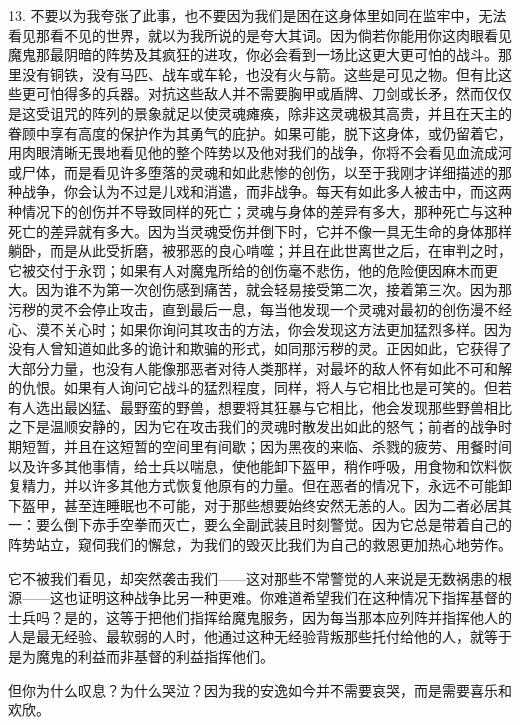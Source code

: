 13. 不要以为我夸张了此事，也不要因为我们是困在这身体里如同在监牢中，无法看见那看不见的世界，就以为我所说的是夸大其词。因为倘若你能用你这肉眼看见魔鬼那最阴暗的阵势及其疯狂的进攻，你必会看到一场比这更大更可怕的战斗。那里没有铜铁，没有马匹、战车或车轮，也没有火与箭。这些是可见之物。但有比这些更可怕得多的兵器。对抗这些敌人并不需要胸甲或盾牌、刀剑或长矛，然而仅仅是这受诅咒的阵列的景象就足以使灵魂瘫痪，除非这灵魂极其高贵，并且在天主的眷顾中享有高度的保护作为其勇气的庇护。如果可能，脱下这身体，或仍留着它，用肉眼清晰无畏地看见他的整个阵势以及他对我们的战争，你将不会看见血流成河或尸体，而是看见许多堕落的灵魂和如此悲惨的创伤，以至于我刚才详细描述的那种战争，你会认为不过是儿戏和消遣，而非战争。每天有如此多人被击中，而这两种情况下的创伤并不导致同样的死亡；灵魂与身体的差异有多大，那种死亡与这种死亡的差异就有多大。因为当灵魂受伤并倒下时，它并不像一具无生命的身体那样躺卧，而是从此受折磨，被邪恶的良心啃噬；并且在此世离世之后，在审判之时，它被交付于永罚；如果有人对魔鬼所给的创伤毫不悲伤，他的危险便因麻木而更大。因为谁不为第一次创伤感到痛苦，就会轻易接受第二次，接着第三次。因为那污秽的灵不会停止攻击，直到最后一息，每当他发现一个灵魂对最初的创伤漫不经心、漠不关心时；如果你询问其攻击的方法，你会发现这方法更加猛烈多样。因为没有人曾知道如此多的诡计和欺骗的形式，如同那污秽的灵。正因如此，它获得了大部分力量，也没有人能像那恶者对待人类那样，对最坏的敌人怀有如此不可和解的仇恨。如果有人询问它战斗的猛烈程度，同样，将人与它相比也是可笑的。但若有人选出最凶猛、最野蛮的野兽，想要将其狂暴与它相比，他会发现那些野兽相比之下是温顺安静的，因为它在攻击我们的灵魂时散发出如此的怒气；前者的战争时期短暂，并且在这短暂的空间里有间歇；因为黑夜的来临、杀戮的疲劳、用餐时间以及许多其他事情，给士兵以喘息，使他能卸下盔甲，稍作呼吸，用食物和饮料恢复精力，并以许多其他方式恢复他原有的力量。但在恶者的情况下，永远不可能卸下盔甲，甚至连睡眠也不可能，对于那些想要始终安然无恙的人。因为二者必居其一：要么倒下赤手空拳而灭亡，要么全副武装且时刻警觉。因为它总是带着自己的阵势站立，窥伺我们的懈怠，为我们的毁灭比我们为自己的救恩更加热心地劳作。\par

它不被我们看见，却突然袭击我们——这对那些不常警觉的人来说是无数祸患的根源——这也证明这种战争比另一种更难。你难道希望我们在这种情况下指挥基督的士兵吗？是的，这等于把他们指挥给魔鬼服务，因为每当那本应列阵并指挥他人的人是最无经验、最软弱的人时，他通过这种无经验背叛那些托付给他的人，就等于是为魔鬼的利益而非基督的利益指挥他们。\par

但你为什么叹息？为什么哭泣？因为我的安逸如今并不需要哀哭，而是需要喜乐和欢欣。\par

